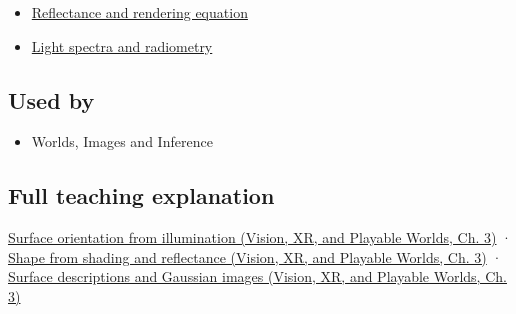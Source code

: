 \begin{itemize}
\tightlist
\item
  \hyperref[appendix-96da0b153b77]{Reflectance and rendering equation}
\item
  \hyperref[appendix-215c2570199b]{Light spectra and radiometry}
\end{itemize}

\subsection{Used by}\label{appendix-89b2d5b7c9e1-used-by}

\hypertarget{appendix-89b2d5b7c9e1-used-by}{}

\begin{itemize}
\tightlist
\item
  {Worlds, Images and Inference}
\end{itemize}

\subsection{Full teaching explanation}\label{appendix-89b2d5b7c9e1-full-teaching-explanation}

\hypertarget{appendix-89b2d5b7c9e1-full-teaching-explanation}{}

\href{../07-Vision-XR-and-Playable-Worlds/main.pdf\#nameddest=04-visual-computing-ii-ch032-surface-orientation-from-illumination}{Surface orientation from illumination (Vision, XR, and Playable Worlds, Ch. 3)} · \href{../07-Vision-XR-and-Playable-Worlds/main.pdf\#nameddest=04-visual-computing-ii-ch032-shape-from-shading-and-reflectance}{Shape from shading and reflectance (Vision, XR, and Playable Worlds, Ch. 3)} · \href{../07-Vision-XR-and-Playable-Worlds/main.pdf\#nameddest=04-visual-computing-ii-ch032-surface-descriptions-and-gaussian-images}{Surface descriptions and Gaussian images (Vision, XR, and Playable Worlds, Ch. 3)}
